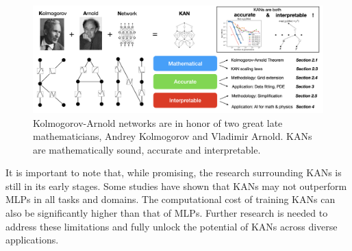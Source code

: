 \begin{figure}[t]
    \centering
    \includegraphics[width=1\linewidth]{Images/flowchart.png}
    \caption{Kolmogorov-Arnold networks are in honor of two great late mathematicians, Andrey Kolmogorov and Vladimir Arnold. KANs are mathematically sound, accurate and interpretable.}
\end{figure}

It is important to note that, while promising, the research surrounding KANs is still in its early stages. Some studies have shown that KANs may not outperform MLPs in all tasks and domains. The computational cost of training KANs can also be significantly higher than that of MLPs. Further research is needed to address these limitations and fully unlock the potential of KANs across diverse applications.